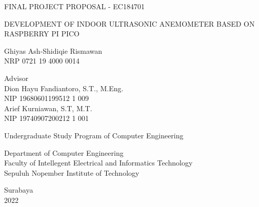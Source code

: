 \begin{large}
  FINAL PROJECT PROPOSAL - EC184701
\end{large}

\vspace{\fill}

\begin{spacing}{1.5}
  \begin{Large}
    DEVELOPMENT OF INDOOR ULTRASONIC ANEMOMETER BASED ON RASPBERRY PI PICO
  \end{Large}
\end{spacing}

\vspace{\fill}

\begin{large}
  Ghiyas Ash-Shidiqie Rismawan \\
  \textmd{NRP 0721 19 4000 0014}
\end{large}

\vspace{\fill}

\begin{large}

  \textmd{Advisor} \\
  Dion Hayu Fandiantoro, S.T., M.Eng. \\
  \textmd{NIP 19680601199512 1 009} \\
  Arief Kurniawan, S.T, M.T. \\
  \textmd{NIP 19740907200212 1 001}
\end{large}

\vspace{\fill}

Undergraduate Study Program of Computer Engineering  \\

\mdseries

Department of Computer Engineering \\
Faculty of Intellegent Electrical and Informatics Technology \\
Sepuluh Nopember Institute of Technology

Surabaya \\
2022

